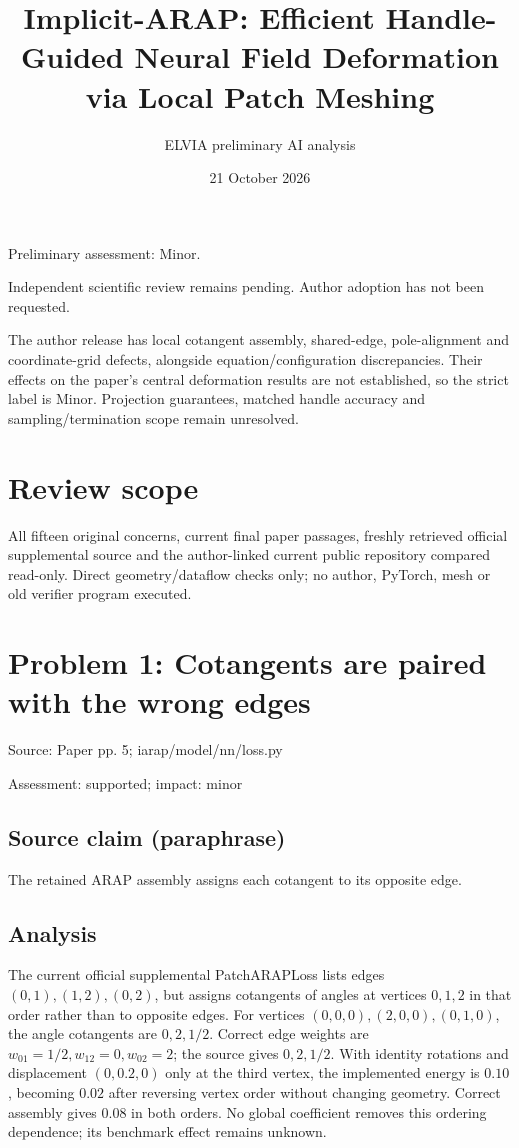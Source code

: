 \documentclass[11pt]{article}
\begin{document}
\title{Implicit-ARAP: Efficient Handle-Guided Neural Field Deformation via Local Patch Meshing}

\author{ELVIA preliminary AI analysis}\date{21 October 2026}\maketitle

Preliminary assessment: Minor.\par

Independent scientific review remains pending. Author adoption has not been requested.

The author release has local cotangent assembly, shared-edge, pole-alignment and coordinate-grid defects, alongside equation/configuration discrepancies. Their effects on the paper's central deformation results are not established, so the strict label is Minor. Projection guarantees, matched handle accuracy and sampling/termination scope remain unresolved.

\section*{Review scope}

All fifteen original concerns, current final paper passages, freshly retrieved official supplemental source and the author-linked current public repository compared read-only. Direct geometry/dataflow checks only; no author, PyTorch, mesh or old verifier program executed.

\section*{Problem 1: Cotangents are paired with the wrong edges}

Source: Paper pp. 5; iarap/model/nn/loss.py

Assessment: supported; impact: minor

\subsection*{Source claim (paraphrase)}

The retained ARAP assembly assigns each cotangent to its opposite edge.

\subsection*{Analysis}

The current official supplemental PatchARAPLoss lists edges \((0,1),(1,2),(0,2)\), but assigns cotangents of angles at vertices \(0,1,2\) in that order rather than to opposite edges. For vertices \((0,0,0),(2,0,0),(0,1,0)\), the angle cotangents are \(0,2,1/2\). Correct edge weights are \(w_{01}=1/2,w_{12}=0,w_{02}=2\); the source gives \(0,2,1/2\). With identity rotations and displacement \((0,0.2,0)\) only at the third vertex, the implemented energy is \(0.10\), becoming \(0.02\) after reversing vertex order without changing geometry. Correct assembly gives \(0.08\) in both orders. No global coefficient removes this ordering dependence; its benchmark effect remains unknown.
\end{document}
